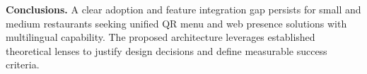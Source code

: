 \noindent\textbf{Conclusions.} A clear adoption and feature integration gap persists for small and medium restaurants seeking unified QR menu and web presence solutions with multilingual capability. The proposed architecture leverages established theoretical lenses to justify design decisions and define measurable success criteria.

